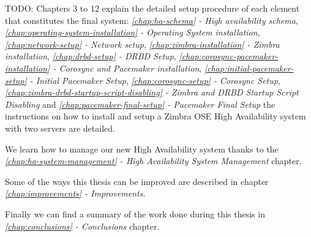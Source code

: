 TODO: Chapters 3 to 12 explain the detailed setup procedure of each element that constitutes the final system: \textit{\ref{chap:ha-schema} - High availability schema},
\textit{\ref{chap:operating-system-installation} - Operating System installation},
\textit{\ref{chap:network-setup} - Network setup},
\textit{\ref{chap:zimbra-installation} - Zimbra installation},
\textit{\ref{chap:drbd-setup} - DRBD Setup},
\textit{\ref{chap:corosync-pacemaker-installation} - Corosync and Pacemaker installation},
\textit{\ref{chap:initial-pacemaker-setup} - Initial Pacemaker Setup},
\textit{\ref{chap:corosync-setup} - Corosync Setup},
\textit{\ref{chap:zimbra-drbd-startup-script-disabling} - Zimbra and DRBD Startup Script Disabling} and
\textit{\ref{chap:pacemaker-final-setup} - Pacemaker Final Setup} the instructions on how to install and setup a Zimbra OSE High Availability system  with two servers are detailed.

We learn how to manage our new High Availability system thanks to the \textit{\ref{chap:ha-system-management} - High Availability System Management} chapter.

Some of the ways this thesis can be improved are described in chapter \textit{\ref{chap:improvements} - Improvements}.

Finally we can find a summary of the work done during this thesis in \textit{\ref{chap:conclusions} - Conclusions} chapter.

